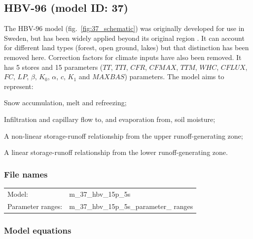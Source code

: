 \subsection{HBV-96 (model ID: 37)}
The HBV-96 model (fig.~\ref{fig:37_schematic}) was originally developed for use in Sweden, but has been widely applied beyond its original region \citep{Lindstrom1997}. It can account for different land types (forest, open ground, lakes) but that distinction has been removed here. Correction factors for climate inputs have also been removed. It has 5 stores and 15 parameters ($TT$, $TTI$, $CFR$, $CFMAX$, $TTM$, $WHC$, $CFLUX$, $FC$, $LP$, $\beta$, $K_0$, $\alpha$, $c$, $K_1$ and $MAXBAS$) parameters. The model aims to represent:

\begin{itemizecompact}
\item Snow accumulation, melt and refreezing;
\item Infiltration and capillary flow to, and evaporation from, soil moisture;
\item A non-linear storage-runoff relationship from the upper runoff-generating zone;
\item A linear storage-runoff relationship from the lower runoff-generating zone.
\end{itemizecompact}

\subsubsection{File names}
\begin{tabular}{@{}ll}
Model: &m\_37\_hbv\_15p\_5s \\
Parameter ranges: &m\_37\_hbv\_15p\_5s\_parameter\_ ranges \\
\end{tabular}

\subsubsection{Model equations}

